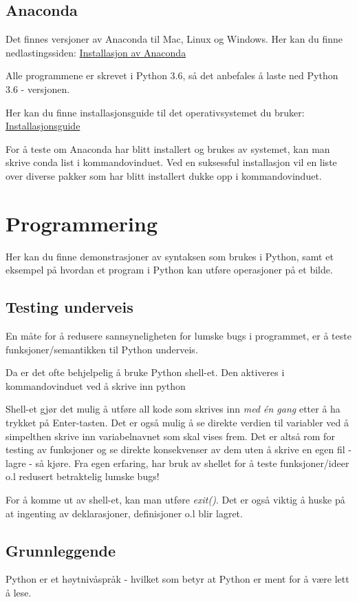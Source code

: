 \documentclass[%
oneside,                 %
final,                   %
10pt]{article}
\begin{document}
\subsection{Anaconda}
Det finnes versjoner av Anaconda til Mac, Linux og Windows. Her kan du finne nedlastingssiden: \href{{https://www.anaconda.com/download/#linux}}{Installasjon av Anaconda}

Alle programmene er skrevet i Python 3.6, så det anbefales å laste ned Python 3.6 - versjonen.

Her kan du finne installasjonsguide til det operativsystemet du bruker: \href{{https://docs.anaconda.com/anaconda/install/}}{Installasjonsguide}

For å teste om Anaconda har blitt installert og brukes av systemet, kan man skrive
\bccq
conda list
\eccq
i kommandovinduet.
Ved en suksessful installasjon vil en liste over diverse pakker som har blitt installert dukke opp i kommandovinduet.

\section{Programmering}
Her kan du finne demonstrasjoner av syntaksen som brukes i Python, samt et eksempel på hvordan et program i Python kan utføre operasjoner på et bilde.

\subsection{Testing underveis}
En måte for å redusere sannsyneligheten for lumske bugs i programmet, er å teste funksjoner/semantikken til Python underveis.

Da er det ofte behjelpelig å bruke Python shell-et. Den aktiveres i kommandovinduet ved å skrive inn
\bccq
python
\eccq

Shell-et gjør det mulig å utføre all kode som skrives inn \emph{med én gang} etter å ha trykket på Enter-tasten. Det er også mulig å se direkte verdien til variabler ved å simpelthen skrive inn variabelnavnet som skal vises frem.
Det er altså rom for testing av funksjoner og se direkte konsekvenser av dem uten å skrive en egen fil - lagre - så kjøre. Fra egen erfaring, har bruk av shellet for å teste funksjoner/ideer o.l redusert betraktelig lumske bugs!

For å komme ut av shell-et, kan man utføre \emph{exit()}. Det er også viktig å huske på at ingenting av deklarasjoner, definisjoner o.l blir lagret.
\subsection{Grunnleggende}
Python er et høytnivåspråk - hvilket som betyr at Python er ment for å være lett å lese.
\end{document}
